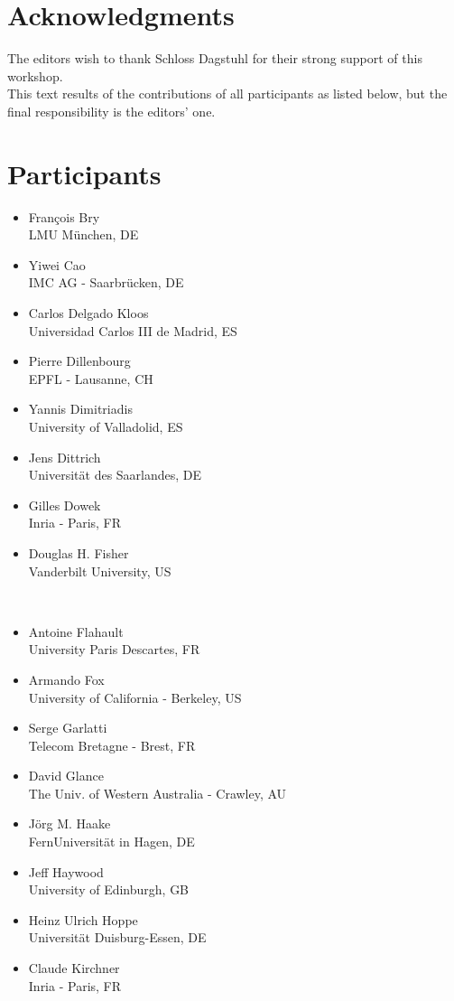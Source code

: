 \section{Acknowledgments}

The editors wish to thank Schloss Dagstuhl for their strong support of this workshop.\\
This text results of the contributions of all participants as listed below, but the final responsibility is the editors' one.

\newpage
\section{Participants}

\begin{minipage}[t]{0.32\linewidth} \footnotesize
  \begin{itemize} 
  \item François Bry\\ LMU München, DE
\item Yiwei Cao\\ IMC AG - Saarbrücken, DE
\item Carlos Delgado Kloos \\ Universidad Carlos III de Madrid, ES
\item Pierre Dillenbourg  \\ EPFL - Lausanne, CH
\item Yannis Dimitriadis \\ University of Valladolid, ES
\item Jens Dittrich \\ Universität des Saarlandes, DE
\item Gilles Dowek \\ Inria - Paris, FR
\item Douglas H. Fisher \\ Vanderbilt University, US
\end{itemize}
\end{minipage}~
\begin{minipage}[t]{0.32\linewidth} \footnotesize
\begin{itemize}
\item Antoine Flahault \\ University Paris Descartes, FR
\item Armando Fox \\ University of California - Berkeley, US
\item Serge Garlatti \\ Telecom Bretagne - Brest, FR
\item David Glance  \\The Univ. of Western Australia - Crawley, AU
\item Jörg M. Haake \\ FernUniversität in Hagen, DE
\item Jeff Haywood \\ University of Edinburgh, GB
\item Heinz Ulrich Hoppe \\ Universität Duisburg-Essen, DE
\item Claude Kirchner \\ Inria - Paris, FR
\end{itemize}
\end{minipage}~
